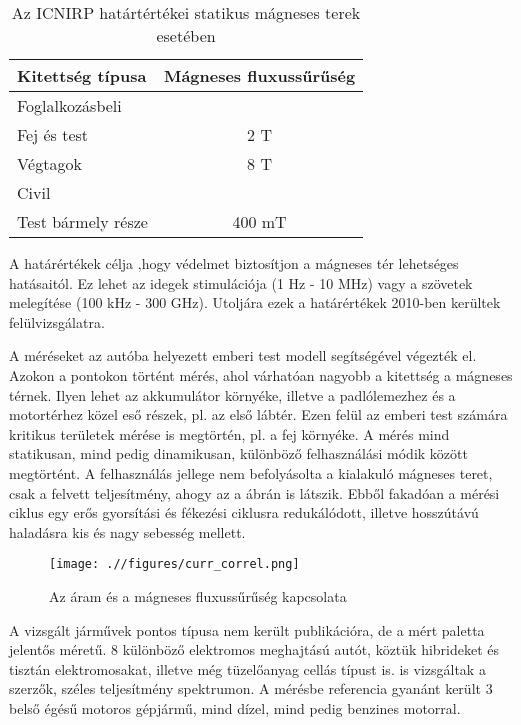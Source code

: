 \begin{table}[h]
\centering
\label{my-label}
\begin{tabular}{lc}
\hline
Kitettség típusa   & Mágneses fluxussűrűség \\ \hline
Foglalkozásbeli    &                        \\
\hspace{3mm}Fej és test        & 2 T                    \\
\hspace{3mm}Végtagok           & 8 T                    \\
Civil              &                        \\
\hspace{3mm}Test bármely része & 400 mT                 \\ \hline
\end{tabular}
\caption{Az ICNIRP határtértékei statikus mágneses terek esetében\cite{artice:icnrip1}}
\end{table}

A határértékek célja ,hogy védelmet biztosítjon a mágneses tér lehetséges hatásaitól. Ez lehet az idegek stimulációja (1 Hz - 10 MHz) vagy a szövetek melegítése (100 kHz - 300 GHz). Utoljára ezek a határértékek 2010-ben kerültek felülvizsgálatra.

A méréseket az autóba helyezett emberi test modell segítségével végezték el. Azokon a pontokon történt mérés, ahol várhatóan nagyobb a kitettség a mágneses térnek. Ilyen lehet az akkumulátor környéke, illetve a padlólemezhez és a motortérhez közel eső részek, pl. az első lábtér. Ezen felül az emberi test számára kritikus területek mérése is megtörtén, pl. a fej környéke. A mérés mind statikusan, mind pedig dinamikusan, különböző felhasználási módik között megtörtént. A felhasználás jellege nem befolyásolta a kialakuló mágneses teret, csak a felvett teljesítmény, ahogy az a  ábrán is látszik. Ebből fakadóan a mérési ciklus egy erős gyorsítási és fékezési ciklusra redukálódott, illetve hosszútávú haladásra kis és nagy sebesség mellett.

\begin{figure}[h]
 \centerline{\texttt{[image: .//figures/curr\_correl.png]}}
 \caption{Az áram és a mágneses fluxussűrűség kapcsolata}
 \label{fig:curr_correlation}
\end{figure}

A vizsgált járművek pontos típusa nem került publikációra, de a mért paletta jelentős méretű. 8 különböző elektromos meghajtású autót, köztük hibrideket és tisztán elektromosakat, illetve még tüzelőanyag cellás típust is. is vizsgáltak a szerzők, széles teljesítmény spektrumon. A mérésbe referencia gyanánt került 3 belső égésű motoros gépjármű, mind dízel, mind pedig benzines motorral.


